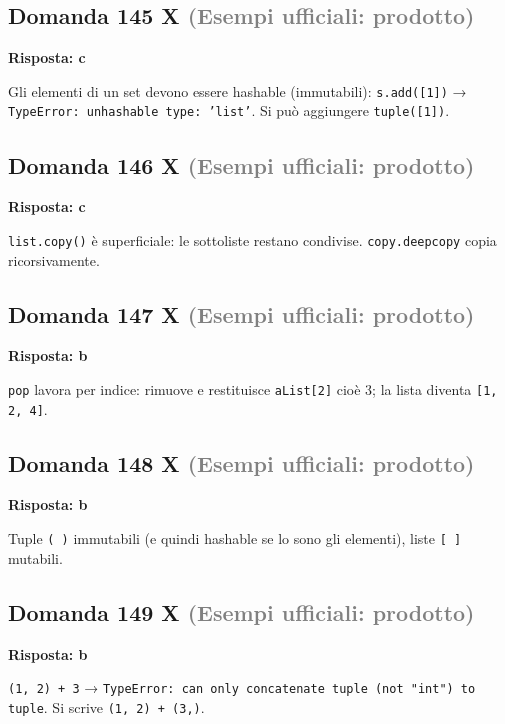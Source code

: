 \documentclass[a4paper,11pt]{article}
\begin{document}
\subsection*{Domanda 145 X \hfill {\small \textcolor{gray}{(Esempi ufficiali: prodotto)}}}
\textbf{Risposta: c}\par
Gli elementi di un set devono essere hashable (immutabili): \texttt{s.add([1])} → \texttt{TypeError: unhashable type: 'list'}. Si può aggiungere \texttt{tuple([1])}.



\subsection*{Domanda 146 X \hfill {\small \textcolor{gray}{(Esempi ufficiali: prodotto)}}}
\textbf{Risposta: c}\par
\texttt{list.copy()} è superficiale: le sottoliste restano condivise. \texttt{copy.deepcopy} copia ricorsivamente.



\subsection*{Domanda 147 X \hfill {\small \textcolor{gray}{(Esempi ufficiali: prodotto)}}}
\textbf{Risposta: b}\par
\texttt{pop} lavora per indice: rimuove e restituisce \texttt{aList[2]} cioè 3; la lista diventa \texttt{[1, 2, 4]}.



\subsection*{Domanda 148 X \hfill {\small \textcolor{gray}{(Esempi ufficiali: prodotto)}}}
\textbf{Risposta: b}\par
Tuple \texttt{( )} immutabili (e quindi hashable se lo sono gli elementi), liste \texttt{[ ]} mutabili.



\subsection*{Domanda 149 X \hfill {\small \textcolor{gray}{(Esempi ufficiali: prodotto)}}}
\textbf{Risposta: b}\par
\texttt{(1, 2) + 3} → \texttt{TypeError: can only concatenate tuple (not "int") to tuple}. Si scrive \texttt{(1, 2) + (3,)}.
\end{document}
